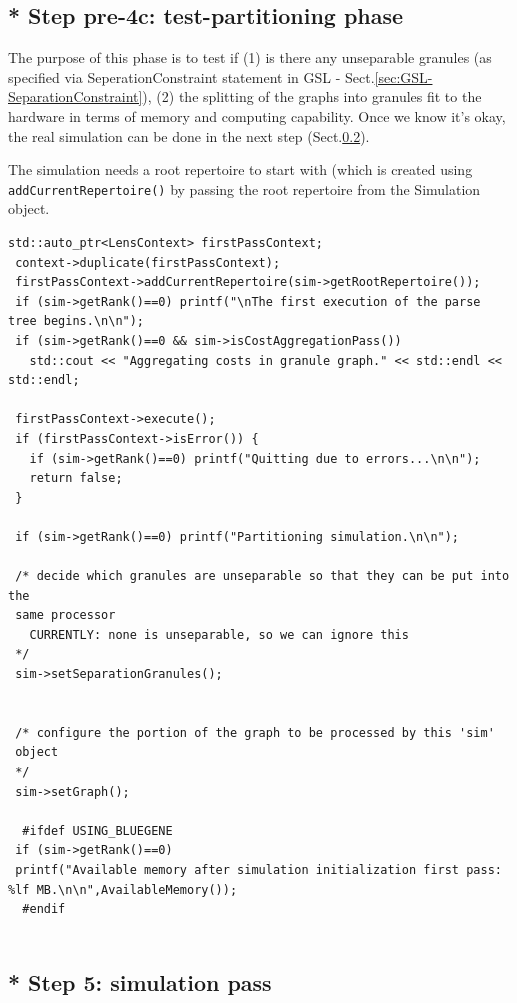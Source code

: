 \subsection{* Step pre-4c: test-partitioning phase}
\label{sec:GSL-test-partitioning-phase}

The purpose of this phase is to test if (1) is there any unseparable granules
(as specified via SeperationConstraint statement in GSL -
Sect.\ref{sec:GSL-SeparationConstraint}), (2) the splitting of the graphs into
granules fit to the hardware in terms of memory and computing capability. Once
we know it's okay, the real simulation can be done in the next step
(Sect.\ref{sec:GSL-simulations-part}).

The simulation needs a root repertoire to start with (which is created using
\verb!addCurrentRepertoire()! by passing the root repertoire from the Simulation
object.


{\small
\begin{lstlisting}
std::auto_ptr<LensContext> firstPassContext;
 context->duplicate(firstPassContext); 
 firstPassContext->addCurrentRepertoire(sim->getRootRepertoire());
 if (sim->getRank()==0) printf("\nThe first execution of the parse tree begins.\n\n");
 if (sim->getRank()==0 && sim->isCostAggregationPass()) 
   std::cout << "Aggregating costs in granule graph." << std::endl << std::endl;
  
 firstPassContext->execute();
 if (firstPassContext->isError()) { 
   if (sim->getRank()==0) printf("Quitting due to errors...\n\n");  
   return false;
 }
 
 if (sim->getRank()==0) printf("Partitioning simulation.\n\n");
 
 /* decide which granules are unseparable so that they can be put into the
 same processor 
   CURRENTLY: none is unseparable, so we can ignore this
 */
 sim->setSeparationGranules();     
 
 
 /* configure the portion of the graph to be processed by this 'sim'
 object
 */
 sim->setGraph();
 
  #ifdef USING_BLUEGENE
 if (sim->getRank()==0) 
 printf("Available memory after simulation initialization first pass: %lf MB.\n\n",AvailableMemory());
  #endif 
 
\end{lstlisting}
}

\subsection{* Step 5: simulation pass}
\label{sec:GSL-simulations-part}
\label{sec:runSimulationAndUI}

